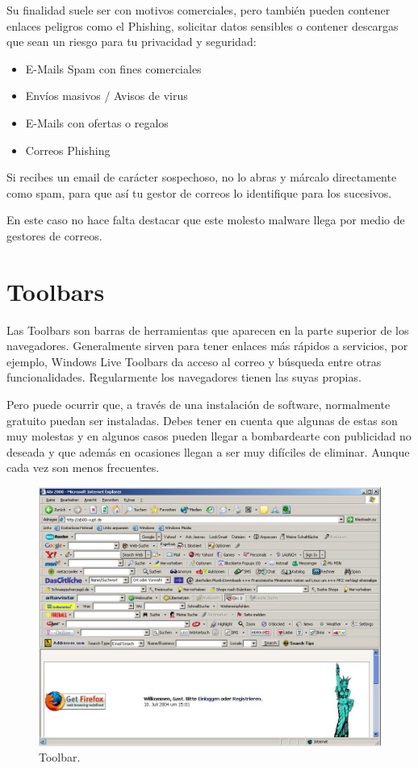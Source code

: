 \documentclass[
  spanish,
  a4paper,
  openany]{book}
\begin{document}
Su finalidad suele ser con motivos comerciales, pero también pueden contener enlaces peligros como el Phishing, solicitar datos sensibles o contener descargas que sean un riesgo para tu privacidad y seguridad:

\begin{itemize}
\item
  E-Mails Spam con fines comerciales
\item
  Envíos masivos / Avisos de virus
\item
  E-Mails con ofertas o regalos
\item
  Correos Phishing
\end{itemize}

Si recibes un email de carácter sospechoso, no lo abras y márcalo directamente como spam, para que así tu gestor de correos lo identifique para los sucesivos.

En este caso no hace falta destacar que este molesto malware llega por medio de gestores de correos.

\hypertarget{toolbars}{%
\section{Toolbars}\label{toolbars}}

Las Toolbars son barras de herramientas que aparecen en la parte superior de los navegadores. Generalmente sirven para tener enlaces más rápidos a servicios, por ejemplo, Windows Live Toolbars da acceso al correo y búsqueda entre otras funcionalidades. Regularmente los navegadores tienen las suyas propias.

Pero puede ocurrir que, a través de una instalación de software, normalmente gratuito puedan ser instaladas. Debes tener en cuenta que algunas de estas son muy molestas y en algunos casos pueden llegar a bombardearte con publicidad no deseada y que además en ocasiones llegan a ser muy difíciles de eliminar. Aunque cada vez son menos frecuentes.

\begin{figure}

{\centering \includegraphics[width=0.75\linewidth]{images/toolbar} 

}

\caption{Toolbar.}\label{fig:unnamed-chunk-20}
\end{figure}
\end{document}
